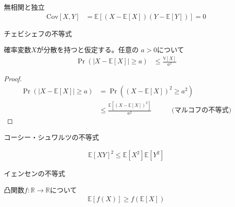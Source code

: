 \documentclass[lualatex,handout]{beamer}
\newcommand{\expt}[1]{\mathbb{E}\left[#1\right]}
\newcommand{\var}[1]{\mathbb{V}\left[#1\right]}
\newcommand{\cov}[1]{\mathrm{Cov}\left[#1\right]}
\theoremstyle{definition}
\begin{document}
\begin{frame}{無相関と独立}
\begin{align*}
\cov{X,Y} &= \expt{(X-\expt{X})(Y-\expt{Y})} = 0
\end{align*}
\end{frame}

\begin{frame}{チェビシェフの不等式}
\begin{lemma}[チェビシェフの不等式]
確率変数$X$が分散を持つと仮定する。任意の $a>0$について
\begin{align*}
\Pr(|X-\expt{X}|\ge a) &\le \frac{\var{X}}{a^2}
\end{align*}
\end{lemma}
\begin{proof}
\begin{align*}
\Pr(|X-\expt{X}|\ge a) &=\Pr((X-\expt{X})^2\ge a^2)\\
&\le\frac{\expt{(X-\expt{X})^2}}{a^2}\hspace{3em}\text{(マルコフの不等式)}
\end{align*}
\end{proof}
\end{frame}

\begin{frame}{コーシー・シュワルツの不等式}
\begin{theorem}
\begin{align*}
\expt{XY}^2 \le \expt{X^2}\expt{Y^2}
\end{align*}
\end{theorem}
\end{frame}

\begin{frame}{イェンセンの不等式}
\begin{theorem}
凸関数$f\colon\mathbb{R}\to\mathbb{R}$について
\begin{align*}
\expt{f(X)} \ge f(\expt{X})
\end{align*}
\end{theorem}

\end{frame}
\end{document}
